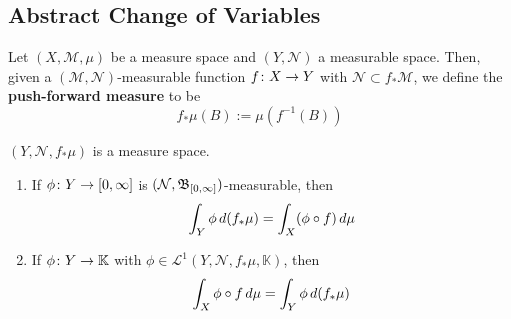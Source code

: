 \documentclass[11pt,leqno,oneside]{amsbook}
\numberwithin{thm}{section}
\newcommand{\M}{\mathcal{M}} %
\newcommand{\cL}{\mathcal{L}}
\newcommand{\cN}{\mathcal{N}}
\newcommand{\K}{\mathbb{K}} %
\renewcommand{\de}{\textbf} %
\begin{document}
\subsection{Abstract Change of Variables}
\begin{defn}
  Let \((X,\M,\mu)\) be a measure space and \((Y,\cN)\) a measurable
  space. Then, given a \((\M,\cN)\)-measurable function \(f \colon X
  \to Y\) with \(\cN \subset f_* \M\), we define the \de{push-forward
    measure} to be \[
    f_* \mu(B) := \mu(f^{-1}(B))
  \]
\end{defn}
\begin{prop}
  \((Y,\cN,f_*\mu)\) is a measure space.
\end{prop}
\begin{thm} \mbox{}
  \begin{enumerate}
  \item If \(\phi \colon Y \to [0,\infty]\) is
    \((\cN,\B_{[0,\infty]})\)-measurable, then \[
      \int_Y \phi \, d(f_*\mu) = \int_X(\phi \circ f) \, d\mu
    \]
  \item If \(\phi \from Y \to \K\) with \(\phi \in \cL^1(Y,\cN,
    f_*\mu,\K)\), then \[
      \int_X \phi\circ f \, d\mu = \int_Y \phi \, d(f_*\mu)
    \]
  \end{enumerate}
\end{thm}
\end{document}
